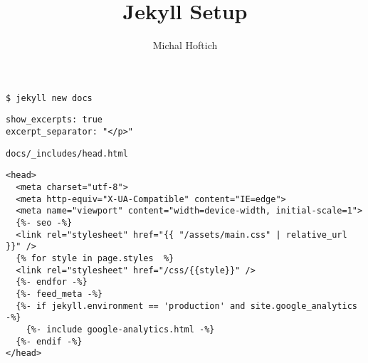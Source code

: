 \documentclass{article}
\title{Jekyll Setup}
\author{Michal Hoftich}
\begin{document}
\maketitle

\begin{verbatim}
$ jekyll new docs
\end{verbatim}

\begin{verbatim}
show_excerpts: true
excerpt_separator: "</p>"
\end{verbatim}


\begin{verbatim}
docs/_includes/head.html
\end{verbatim}

\begin{verbatim}
<head>
  <meta charset="utf-8">
  <meta http-equiv="X-UA-Compatible" content="IE=edge">
  <meta name="viewport" content="width=device-width, initial-scale=1">
  {%- seo -%}
  <link rel="stylesheet" href="{{ "/assets/main.css" | relative_url }}" />
  {% for style in page.styles  %}
  <link rel="stylesheet" href="/css/{{style}}" />
  {%- endfor -%}
  {%- feed_meta -%}
  {%- if jekyll.environment == 'production' and site.google_analytics -%}
    {%- include google-analytics.html -%}
  {%- endif -%}
</head>
\end{verbatim}
\end{document}
